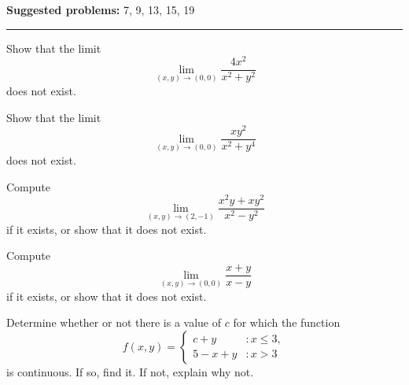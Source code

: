 \documentclass[12pt,reqno]{amsart}
\begin{document}
\textbf{Suggested problems:} 7, 9, 13, 15, 19

\bigskip
\hrule

\bigskip

\prob Show that the limit
	\[\lim_{(x,y) \to (0,0)} \frac{4x^2}{x^2+y^2}
	\]
does not exist.

\vfill
\prob Show that the limit
	\[\lim_{(x,y)\to (0,0)} \frac{ xy^2}{x^2+y^4}
	\]
does not exist.

\vfill
\newpage
\prob Compute
	\[\lim_{(x,y) \to (2,-1)} \frac{x^2y+xy^2}{x^2-y^2}
	\]
if it exists, or show that it does not exist.

\vfill
\prob Compute
	\[\lim_{(x,y)\to(0,0)} \frac{x+y}{x-y}
	\]
if it exists, or show that it does not exist.

\vfill
\prob Determine whether or not there is a value of $c$ for which the function
	\[f(x,y) = \begin{cases}
	c+y & : x\leq 3, \\
	5-x+y & : x>3
	\end{cases}
	\]
is continuous. If so, find it. If not, explain why not.

\vfill
\end{document}
